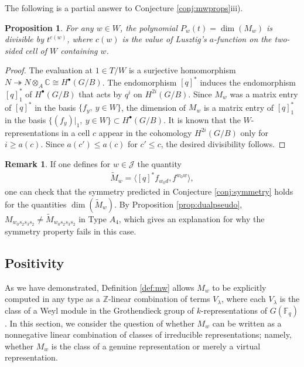 \documentclass{amsart}
\newtheorem{prop}[thm]{Proposition}
\theoremstyle{definition}
\newtheorem{remark}[thm]{Remark}
\begin{document}
The following is a partial answer to Conjecture \ref{conj:mwprops}iii).
\begin{prop}
    For any $w \in W$, the polynomial $P_w(t) = \dim(M_w)$ is divisible by $t^{c(w)}$, where $c(w)$ is the value of Lusztig's $a$-function on the two-sided cell of $W$ containing $w$.
\end{prop}
\begin{proof}
    The evaluation at $1\in T/W$ is a surjective homomorphism
  $N\twoheadrightarrow N\otimes_A\mathbb{C}\cong H^\bullet(G/B)$. The endomorphism
  $[q]^*$ induces the endomorphism $[q]^*_1$ of $H^\bullet(G/B)$ that acts by
  $q^i$ on $H^{2i}(G/B)$. Since $M_w$ was a matrix entry of $[q]^*$ in
  the basis $\{f_y,\ y\in W\}$, the dimension of $M_w$ is a matrix entry
  of $[q]^*_1$ in the basis $\{(f_y)|_1,\ y\in W\} \subset H^\bullet(G/B)$. It is known that
  the $W$-representations in a cell $c$ appear in the cohomology $H^{2i}(G/B)$
  only for $i\geq a(c)$. Since $a(c')\leq a(c)$ for $c'\leq c$, the desired
  divisibility follows.
\end{proof}

\begin{remark}
    If one defines for $w \in \mathcal{J}$ the quantity
    \begin{align}
        \tilde M_w = \langle [q]^*f_{w_0d}, f^{w_0w}\rangle,
    \end{align}
    one can check that the symmetry predicted in Conjecture \ref{conj:symmetry} holds for the quantities $\dim(\tilde{M}_w)$. By Proposition \ref{prop:dualpseudo}, $M_{w_0s_2s_3s_2} \neq \tilde{M}_{w_0s_2s_3s_2}$ in Type $A_4$, which gives an explanation for why the symmetry property fails in this case.
\end{remark}

\subsection{Positivity} As we have demonstrated, Definition \ref{def:mw} allows $M_w$ to be explicitly computed in any type as a $\mathbb{Z}$-linear combination of terms $V_{\lambda}$, where each $V_{\lambda}$ is the class of a Weyl module in the Grothendieck group of $k$-representations of $G(\mathbb{F}_q)$. In this section, we consider the question of whether $M_w$ can be written as a nonnegative linear combination of classes of irreducible representations; namely, whether $M_w$ is the class of a genuine representation or merely a virtual representation.
\end{document}
